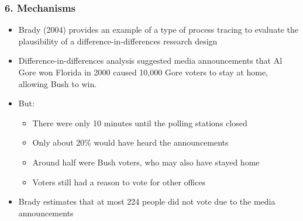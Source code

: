 \documentclass[xcolor=x11names,compress]{beamer}\usepackage[]{graphicx}\usepackage[]{color}
\renewcommand{\(}{\begin{columns}}
\renewcommand{\)}{\end{columns}}
\newcommand{\<}[1]{\begin{column}{#1}}
\renewcommand{\>}{\end{column}}
\begin{document}
\begin{frame}
\frametitle{6. Mechanisms}
\begin{itemize}
\item Brady (2004) provides an example of a type of process tracing to evaluate the plausibility of a difference-in-differences research design
\pause
\item Difference-in-differences analysis suggested media announcements that Al Gore won Florida in 2000 caused 10,000 Gore voters to stay at home, allowing Bush to win.
\pause
\item But:
\pause
\begin{itemize}
\item There were only 10 minutes until the polling stations closed
\pause
\item Only about 20\% would have heard the announcements
\pause
\item Around half were Bush voters, who may also have stayed home
\pause
\item Voters still had a reason to vote for other offices
\pause
\end{itemize}
\item Brady estimates that at most 224 people did not vote due to the media announcements
\end{itemize}
\end{frame}
\end{document}
